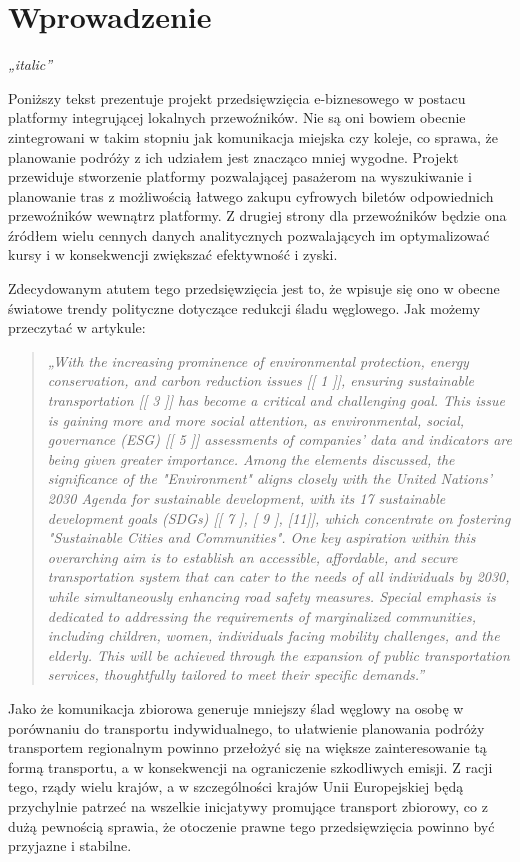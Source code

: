 \chapter{Wprowadzenie}
\label{chap:pierwszy}

\textit{„italic”}

Poniższy tekst prezentuje projekt przedsięwzięcia e-biznesowego w postacu platformy integrującej lokalnych przewoźników. Nie są oni bowiem obecnie zintegrowani w takim stopniu jak komunikacja miejska czy koleje, co sprawa, że planowanie podróży z ich udziałem jest znacząco mniej wygodne. Projekt przewiduje stworzenie platformy pozwalającej pasażerom na wyszukiwanie i planowanie tras z możliwością łatwego zakupu cyfrowych biletów odpowiednich przewoźników wewnątrz platformy. Z drugiej strony dla przewoźników będzie ona źródłem wielu cennych danych analitycznych pozwalających im optymalizować kursy i w konsekwencji zwiększać efektywność i zyski.

Zdecydowanym atutem tego przedsięwzięcia jest to, że wpisuje się ono w obecne światowe trendy polityczne dotyczące redukcji śladu węglowego. Jak możemy przeczytać w artykule:
\begin{quote}\textit{„With the increasing prominence of environmental protection, energy conservation, and carbon reduction issues [[ 1 ]], ensuring sustainable transportation [[ 3 ]] has become a critical and challenging goal. This issue is gaining more and more social attention, as environmental, social, governance (ESG) [[ 5 ]] assessments of companies' data and indicators are being given greater importance. Among the elements discussed, the significance of the "Environment" aligns closely with the United Nations' 2030 Agenda for sustainable development, with its 17 sustainable development goals (SDGs) [[ 7 ], [ 9 ], [11]], which concentrate on fostering "Sustainable Cities and Communities". One key aspiration within this overarching aim is to establish an accessible, affordable, and secure transportation system that can cater to the needs of all individuals by 2030, while simultaneously enhancing road safety measures. Special emphasis is dedicated to addressing the requirements of marginalized communities, including children, women, individuals facing mobility challenges, and the elderly. This will be achieved through the expansion of public transportation services, thoughtfully tailored to meet their specific demands.”} \citep{advancingESG} \end{quote}
Jako że komunikacja zbiorowa generuje mniejszy ślad węglowy na osobę w porównaniu do transportu indywidualnego, to ułatwienie planowania podróży transportem regionalnym powinno przełożyć się na większe zainteresowanie tą formą transportu, a w konsekwencji na ograniczenie szkodliwych emisji. Z racji tego, rządy wielu krajów, a w szczególności krajów Unii Europejskiej będą przychylnie patrzeć na wszelkie inicjatywy promujące transport zbiorowy, co z dużą pewnością sprawia, że otoczenie prawne tego przedsięwzięcia powinno być przyjazne i stabilne.

